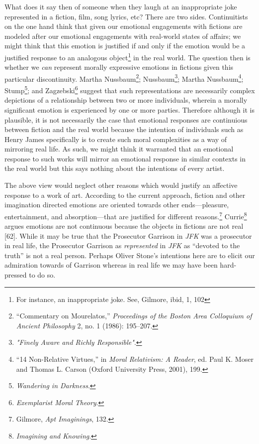 \documentclass[phdthesis,12pt,final,a4paper]{wuthesis}
\theoremstyle{definition}
\theoremstyle{definition}
\theoremstyle{definition}
\theoremstyle{definition}
\theoremstyle{remark}
\begin{document}
What does it say then of someone when they laugh at an inappropriate joke represented in a fiction, film, song lyrics, etc? There are two sides. Continuitists on the one hand think that given our emotional engagements with fictions are modeled after our emotional engagements with real-world states of affairs; we might think that this emotion is justified if and only if the emotion would be a justified response to an analogous object\footnote{For instance, an inappropriate joke. See, Gilmore, ibid, 1, 102} in the real world. The question then is whether we \emph{can} represent morally expressive emotions in fictions given this particular discontinuity. Martha Nussbaum\footnote{{``Commentary on {Mourelatos},''} \emph{Proceedings of the Boston Area Colloquium of Ancient Philosophy} 2, no. 1 (1986): 195--207.}; Nussbaum\footnote{\emph{"{Finely Aware} and {Richly Responsible}"}.}; Martha Nussbaum\footnote{{``14 {Non-Relative Virtues},''} in \emph{Moral {Relativism}: {A Reader}}, ed. Paul K. Moser and Thomas L. Carson (Oxford University Press, 2001), 199.}; Stump\footnote{\emph{Wandering in {Darkness}}.}; and Zagzebski\footnote{\emph{Exemplarist {Moral Theory}}.} suggest that such representations are necessarily complex depictions of a relationship between two or more individuals, wherein a morally significant emotion is experienced by one or more parties. Therefore although it is plausible, it is not necessarily the case that emotional responses are continuious between fiction and the real world because the intention of individuals such as Henry James specifically is to create such moral complexities as a way of mirroring real life. As such, we might think it warranted that an emotional response to such works will mirror an emotional response in similar contexts in the real world but this says nothing about the intentions of every artist.

The above view would neglect other reasons which would justify an affective response to a work of art. According to the current approach, fiction and other imagination directed emotions are oriented towards other ends---pleasure, entertainment, and absorption---that are justified for different reasons.\footnote{Gilmore, \emph{Apt {Imaginings}}, 132.} Currie\footnote{\emph{Imagining and Knowing}.} argues emotions are not continuous because the objects in fictions are not real {[}62{]}. While it may be true that the Prosecutor Garrison in \emph{JFK} was a prosecutor in real life, the Prosecutor Garrison as \emph{represented} in \emph{JFK} as ``devoted to the truth'' is not a real person. Perhaps Oliver Stone's intentions here are to elicit our admiration towards of Garrison whereas in real life we may have been hard-pressed to do so.
\end{document}
